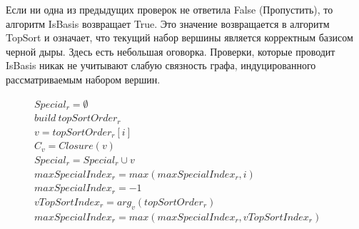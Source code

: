 \documentclass[12pt,a4paper,oneside,openany]{article}
\theoremstyle{definition}
\theoremstyle{lemma}
\theoremstyle{remark}
\begin{document}
Если ни одна из предыдущих проверок не ответила False (Пропустить), то алгоритм IsBasis возвращает True.
Это значение возвращается в алгоритм TopSort и означает, что текущий набор вершины является корректным базисом черной дыры.
Здесь есть небольшая оговорка. Проверки, которые проводит IsBasis никак не учитывают слабую связность
графа, индуцированного рассматриваемым набором вершин.

\linespread{0.93}
\begin{figure}[H]
	\begin{center}
		\begin{algorithm}[H]
			\SetAlgoLined
                         {
                            $Special_r = \emptyset$ \\
                            $build\ topSortOrder_r$ \\
                             {
                                $v = topSortOrder_r[i]$ \\
                                $C_v = Closure(v)$ \\
                                 {
                                    $Special_r = Special_r \cup v$ \\
                                    $maxSpecialIndex_r = max(maxSpecialIndex_r, i)$ \\
                                }
                            }
                        }
                         {
                            $maxSpecialIndex_r = -1$ \\
                        }
			 {
                             {
                                 {
                                    $vTopSortIndex_r = arg_v (topSortOrder_r)$ \\
                                    $maxSpecialIndex_r = max(maxSpecialIndex_r, vTopSortIndex_r)$ \\
}}}
\end{algorithm}
\end{center}
\end{figure}
\end{document}
